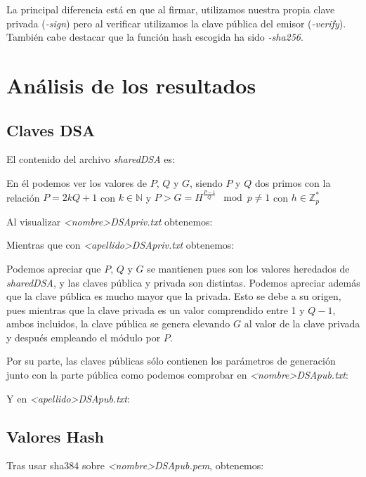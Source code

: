 \documentclass[a4paper, 11pt]{article}
\begin{document}
			La principal diferencia está en que al firmar, utilizamos nuestra propia clave privada (\textit{-sign}) pero
			al verificar utilizamos la clave pública del emisor (\textit{-verify}). También cabe destacar que la función hash
			escogida ha sido \textit{-sha256}.
			
\section{Análisis de los resultados}
	\subsection{Claves DSA}
		El contenido del archivo \textit{sharedDSA} es:
		

		En él podemos ver los valores de $P$, $Q$ y $G$, siendo $P$ y $Q$ dos primos con la relación $P = 2kQ+1$ con $k \in
		\mathbb{N}$ y $P > G = H^{\frac{P-1}{Q}} \mod{p} \neq 1$ con $h \in \mathbb{Z}^*_p$
		
		Al visualizar \textit{<nombre>DSApriv.txt} obtenemos:
		
		
		Mientras que con \textit{<apellido>DSApriv.txt} obtenemos:
		
		
		Podemos apreciar que $P$, $Q$ y $G$ se mantienen pues son los valores heredados de \textit{sharedDSA}, y las claves
		pública y privada son distintas. Podemos apreciar además que la clave pública es mucho mayor que la privada. Esto se
		debe a su origen, pues mientras que la clave privada es un valor comprendido entre 1 y $Q-1$, ambos incluidos, la
		clave pública se genera elevando $G$ al valor de la clave privada y después empleando el módulo por $P$.

		Por su parte, las claves públicas sólo contienen los parámetros de generación junto con la parte pública como podemos
		comprobar en \textit{<nombre>DSApub.txt}:
		
		
		Y en \textit{<apellido>DSApub.txt}:
		
		
	\subsection{Valores Hash}
		Tras usar sha384 sobre \textit{<nombre>DSApub.pem}, obtenemos:
		
		
\end{document}
